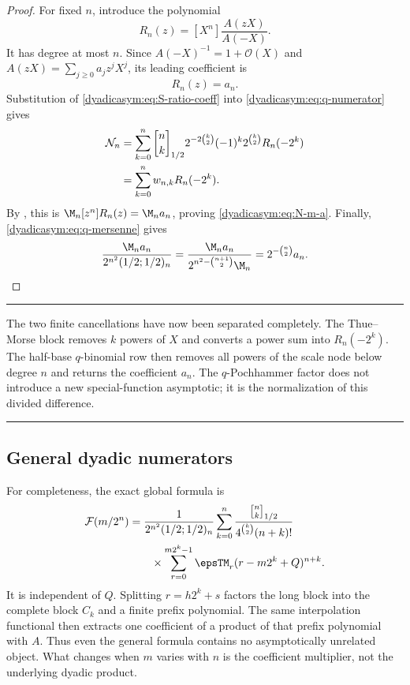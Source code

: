 \documentclass[11pt,oneside]{article}
\theoremstyle{definition}
\theoremstyle{remark}
\newcommand{\bigO}{\mathcal O}
\newcommand{\qbinom}[3]{\genfrac{[}{]}{0pt}{}{#1}{#2}_{#3}}
\newenvironment{boxedremark}{%
  \par\smallskip\noindent\begin{center}\begin{minipage}{0.94\textwidth}%
  \color{black}\hrule\vspace{0.6em}\small
}{%
  \vspace{0.6em}\hrule\end{minipage}\end{center}\smallskip
}
\begin{document}
\begin{proof}
For fixed $n$, introduce the polynomial
\begin{equation}
 R_n(z)=[X^n]\frac{A(zX)}{A(-X)}.                           \label{dyadicasym:eq:Rn}
\end{equation}
It has degree at most $n$.  Since $A(-X)^{-1}=1+\bigO(X)$ and
$A(zX)=\sum_{j\ge0}a_jz^jX^j$, its leading coefficient is
\begin{equation}
 [z^n]R_n(z)=a_n.                                           \label{dyadicasym:eq:Rn-leading}
\end{equation}
Substitution of \eqref{dyadicasym:eq:S-ratio-coeff} into \eqref{dyadicasym:eq:q-numerator} gives
\begin{align}
 \mathcal N_n
 &=\sum_{k=0}^n
 \qbinom nk{1/2}2^{-2\binom k2}
 (-1)^k2^{\binom k2}R_n(-2^k)                              \notag\\
 &=\sum_{k=0}^n w_{n,k}R_n(-2^k).                          \label{dyadicasym:eq:N-interpolation}
\end{align}
By , this is $\M_n[z^n]R_n(z)=\M_na_n$, proving
\eqref{dyadicasym:eq:N-m-a}.  Finally, \eqref{dyadicasym:eq:q-mersenne} gives
\begin{equation*}
 \frac{\M_na_n}{2^{n^2}(1/2;1/2)_n}
 =\frac{\M_na_n}{2^{n^2-\binom{n+1}{2}}\M_n}
 =2^{-\binom n2}a_n.
\end{equation*}
\end{proof}

\begin{boxedremark}
The two finite cancellations have now been separated completely.  The Thue--Morse block
removes $k$ powers of $X$ and converts a power sum into $R_n(-2^k)$.  The half-base
$q$-binomial row then removes all powers of the scale node below degree $n$ and returns the
coefficient $a_n$.  The $q$-Pochhammer factor does not introduce a new special-function
asymptotic; it is the normalization of this divided difference.
\end{boxedremark}

\subsection{General dyadic numerators}

For completeness, the exact global formula is
\begin{align}
 \mathcal F(m/2^n)
 &=\frac{1}{2^{n^2}(1/2;1/2)_n}
 \sum_{k=0}^{n}
 \frac{\qbinom nk{1/2}}{4^{\binom k2}(n+k)!}                \notag\\
 &\qquad\times
 \sum_{r=0}^{m2^k-1}\epsTM_r(r-m2^k+Q)^{n+k}.              \label{dyadicasym:eq:q-global}
\end{align}
It is independent of $Q$.  Splitting $r=h2^k+s$ factors the long block into the complete
block $C_k$ and a finite prefix polynomial.  The same interpolation functional then extracts
one coefficient of a product of that prefix polynomial with $A$.  Thus even the general
formula contains no asymptotically unrelated object.  What changes when $m$ varies with $n$
is the coefficient multiplier, not the underlying dyadic product.
\end{document}
